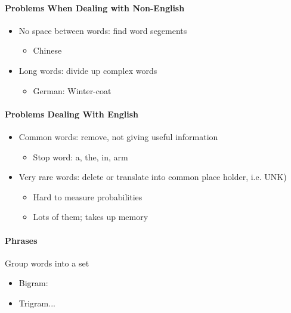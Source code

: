       \paragraph{Problems When Dealing with Non-English}
      \begin{itemize}
        \item No space between words: find word segements
        \begin{itemize}
          \item Chinese
        \end{itemize}

        \item Long words: divide up complex words
        \begin{itemize}
          \item German: Winter-coat
        \end{itemize}
      \end{itemize}

      \paragraph{Problems Dealing With English}
      \begin{itemize}
        \item Common words: remove, not giving useful information
        \begin{itemize}
          \item Stop word: a, the, in, arm
        \end{itemize}

        \item Very rare words: delete or translate into common place holder, i.e. UNK)
        \begin{itemize}
          \item Hard to measure probabilities
          \item Lots of them; takes up memory
        \end{itemize}
      \end{itemize}

      \paragraph{Phrases}
      Group words into a set
      \begin{itemize}
        \item Bigram: 
        \item Trigram...
      \end{itemize}

